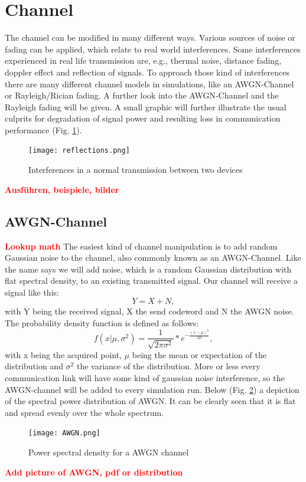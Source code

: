 \documentclass[12pt,oneside, draft]{report}
\newcommand\boldred[1]{\textcolor{red}{\textbf{#1}}}
\begin{document}
\section{Channel}
\label{sec:channel}
The channel can be modified in many different ways. Various sources of noise or fading can be applied, which relate to real world interferences. Some interferences experienced in real life transmission are, e.g., thermal noise, distance fading, doppler effect and reflection of signals. To approach those kind of interferences there are many different channel models in simulations, like an \gls{AWGN}-Channel or Rayleigh/Rician fading. A further look into the \gls{AWGN}-Channel and the Rayleigh fading will be given. A small graphic will further illustrate the usual culprits for degradation of signal power and resulting loss in communication performance (Fig. \ref{fig:interferences}).
\newline
\begin{figure}[H]
	\centering
	\texttt{[image: reflections.png]}
	\caption{Interferences in a normal transmission between two devices}
	\label{fig:interferences}
\end{figure}
\boldred{Ausführen, beispiele, bilder}
\newpage
\subsection{AWGN-Channel}
\boldred{Lookup math}
\newline
The easiest kind of channel manipulation is to add random Gaussian noise to the channel, also commonly known as an \gls{AWGN}-Channel. Like the name says we will add noise, which is a random Gaussian distribution with flat spectral density, to an existing transmitted signal. Our channel will receive a signal like this:
\begin{equation}
\label{eq:1.1}
Y = X + N ,
\end{equation}
 with Y being the received signal, X the send codeword and N the AWGN noise.
\newline
The probability density function is defined as follows:
\begin{equation}
\label{eq:AWGNpdf}
f(x|\mu,\sigma^2) = \frac{1}{\sqrt{2\pi\sigma^2}}*e^{-\frac{(x-\mu)^2}{2\mu}},  
\end{equation}
with x being the acquired point, $\mu$ being the mean or expectation of the distribution and $\sigma^2$ the variance of the distribution. 
\newline
More or less every communication link will have some kind of gaussian noise interference, so the \gls{AWGN}-channel will be added to every simulation run.  Below (Fig. \ref{fig:AWGN}) a depiction of the spectral power distribution of \gls{AWGN}. It can be clearly seen that it is flat and spread evenly over the whole spectrum.
\begin{figure}[H]
	\centering
	\texttt{[image: AWGN.png]}
	\caption{Power spectral density for a AWGN channel}
	\label{fig:AWGN}
\end{figure}
\boldred{Add picture of AWGN, pdf or distribution}
\end{document}
